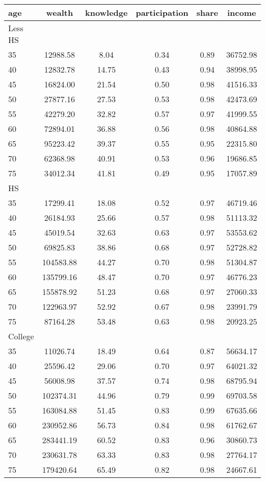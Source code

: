  \begin{tabular}{lccccc}
 \hline \hline
  age & wealth & knowledge & participation & share & income \\
 \hline
 Less HS & & & & & \\
 \hline
35 &  12988.58 &      8.04 &      0.34 &      0.89 &  36752.98 \\ 
40 &  12832.78 &     14.75 &      0.43 &      0.94 &  38998.95 \\ 
45 &  16824.00 &     21.54 &      0.50 &      0.98 &  41516.33 \\ 
50 &  27877.16 &     27.53 &      0.53 &      0.98 &  42473.69 \\ 
55 &  42279.20 &     32.82 &      0.57 &      0.97 &  41999.55 \\ 
60 &  72894.01 &     36.88 &      0.56 &      0.98 &  40864.88 \\ 
65 &  95223.42 &     39.37 &      0.55 &      0.95 &  22315.80 \\ 
70 &  62368.98 &     40.91 &      0.53 &      0.96 &  19686.85 \\ 
75 &  34012.34 &     41.81 &      0.49 &      0.95 &  17057.89 \\ 
 \hline
 HS & & & & & \\
 \hline
35 &  17299.41 &     18.08 &      0.52 &      0.97 &  46719.46 \\ 
40 &  26184.93 &     25.66 &      0.57 &      0.98 &  51113.32 \\ 
45 &  45019.54 &     32.63 &      0.63 &      0.97 &  53553.62 \\ 
50 &  69825.83 &     38.86 &      0.68 &      0.97 &  52728.82 \\ 
55 & 104583.88 &     44.27 &      0.70 &      0.98 &  51304.87 \\ 
60 & 135799.16 &     48.47 &      0.70 &      0.97 &  46776.23 \\ 
65 & 155878.92 &     51.23 &      0.68 &      0.97 &  27060.33 \\ 
70 & 122963.97 &     52.92 &      0.67 &      0.98 &  23991.79 \\ 
75 &  87164.28 &     53.48 &      0.63 &      0.98 &  20923.25 \\ 
 \hline
 College & & & & & \\
 \hline
35 &  11026.74 &     18.49 &      0.64 &      0.87 &  56634.17 \\ 
40 &  25596.42 &     29.06 &      0.70 &      0.97 &  64021.32 \\ 
45 &  56008.98 &     37.57 &      0.74 &      0.98 &  68795.94 \\ 
50 & 102374.31 &     44.96 &      0.79 &      0.99 &  69703.58 \\ 
55 & 163084.88 &     51.45 &      0.83 &      0.99 &  67635.66 \\ 
60 & 230952.86 &     56.73 &      0.84 &      0.98 &  61762.67 \\ 
65 & 283441.19 &     60.52 &      0.83 &      0.96 &  30860.73 \\ 
70 & 230631.78 &     63.33 &      0.83 &      0.98 &  27764.17 \\ 
75 & 179420.64 &     65.49 &      0.82 &      0.98 &  24667.61 \\ 
 \hline \hline
 \end{tabular}
